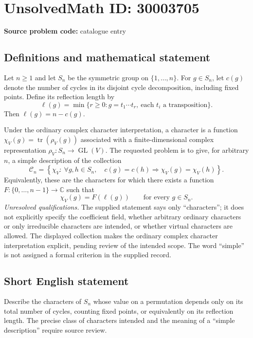 \documentclass[11pt]{article}
\newcommand{\C}{\mathbb{C}}
\begin{document}
\section*{UnsolvedMath ID: 30003705}
\textbf{Source problem code:} catalogue entry
\subsection{Definitions and mathematical statement}
Let \(n\geq 1\) and let \(S_n\) be the symmetric group on \(\{1,\ldots,n\}\). For \(g\in S_n\), let \(c(g)\) denote the number of cycles in its disjoint cycle decomposition, including fixed points. Define its reflection length by
\[
\ell(g)=\min\{r\geq 0:g=t_1\cdots t_r,\ \text{each }t_i\text{ a transposition}\}.
\]
Then \(\ell(g)=n-c(g)\).

Under the ordinary complex character interpretation, a character is a function \(\chi_V(g)=\operatorname{tr}(\rho_V(g))\) associated with a finite-dimensional complex representation \(\rho_V:S_n\to\operatorname{GL}(V)\). The requested problem is to give, for arbitrary \(n\), a simple description of the collection
\[
\mathcal C_n=\left\{\chi_V:\ \forall g,h\in S_n,\quad c(g)=c(h)\Longrightarrow\chi_V(g)=\chi_V(h)\right\}.
\]
Equivalently, these are the characters for which there exists a function \(F:\{0,\ldots,n-1\}\to\C\) such that
\[
\chi_V(g)=F(\ell(g))\qquad\text{for every }g\in S_n.
\]
\emph{Unresolved qualifications.} The supplied statement says only ``characters''; it does not explicitly specify the coefficient field, whether arbitrary ordinary characters or only irreducible characters are intended, or whether virtual characters are allowed. The displayed collection makes the ordinary complex character interpretation explicit, pending review of the intended scope. The word ``simple'' is not assigned a formal criterion in the supplied record.
\subsection{Short English statement}
Describe the characters of \(S_n\) whose value on a permutation depends only on its total number of cycles, counting fixed points, or equivalently on its reflection length. The precise class of characters intended and the meaning of a ``simple description'' require source review.
\end{document}
